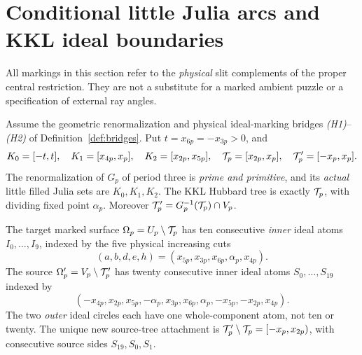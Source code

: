 \section{Conditional little Julia arcs and KKL ideal boundaries}
\label{sec:marking}
All markings in this section refer to the \emph{physical}
slit complements of the proper central restriction.
They are not a substitute for a marked ambient puzzle
or a specification of external ray angles.

\begin{theorem}
\label{thm:marking}
Assume the geometric renormalization and physical ideal-marking
bridges \emph{(H1)}--\emph{(H2)} of
Definition~\ref{def:bridges}.
Put $t=x_{6p}=-x_{3p}>0$, and
\begin{equation}\label{eq:tree}
 K_0=[-t,t],\quad K_1=[x_{4p},x_p],\quad
 K_2=[x_{2p},x_{5p}],\quad
 \mathcal T_p=[x_{2p},x_p],\quad
 \mathcal T'_p=[-x_p,x_p].
\end{equation}
The renormalization of $G_p$ of period three is
\emph{prime and primitive}, and its \emph{actual}
little filled Julia sets are $K_0,K_1,K_2$.
The KKL Hubbard tree is exactly $\mathcal T_p$, with
dividing fixed point $\alpha_p$.
Moreover $\mathcal T'_p=G_p^{-1}(\mathcal T_p)\cap V_p$.

The target marked surface $\Omega_p=U_p\setminus\mathcal T_p$
has ten consecutive \emph{inner} ideal atoms
$I_0,\ldots,I_9$, indexed by the five physical
increasing cuts
\[
 (a,b,d,e,h)=(x_{5p},x_{3p},x_{6p},\alpha_p,x_{4p}).
\]
The source $\Omega'_p=V_p\setminus\mathcal T'_p$
has twenty consecutive inner ideal atoms
$S_0,\ldots,S_{19}$ indexed by
\[
 (-x_{4p},x_{2p},x_{5p},-\alpha_p,x_{3p},
 x_{6p},\alpha_p,-x_{5p},-x_{2p},x_{4p}).
\]
The two \emph{outer} ideal circles each have one
whole-component atom, not ten or twenty.
The unique new source-tree attachment is
$\mathcal T'_p\setminus\mathcal T_p=[-x_p,x_{2p})$, with
consecutive source sides $S_{19},S_0,S_1$.
\end{theorem}

